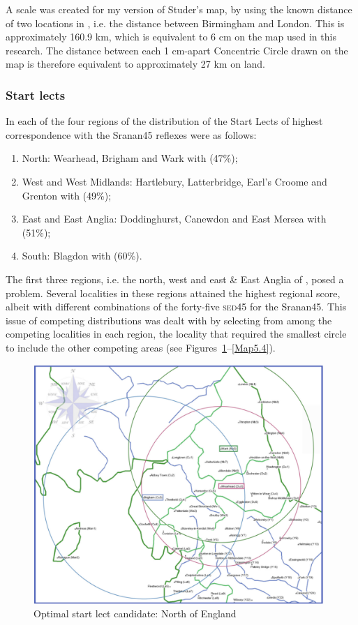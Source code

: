 A scale was created for my version of Studer's map, by using the known distance of two locations in , i.e. the distance between Birmingham and London. This is approximately 160.9 km, which is equivalent to 6 cm on the map used in this research. The distance between each 1 cm-apart Concentric Circle drawn on the map is therefore equivalent to approximately 27 km on land.

\subsubsection{Start lects}\label{5.4.1.1}
In each of the four regions of  the distribution of the Start Lects
of highest correspondence with the  Sranan45 reflexes were as follows:

\begin{enumerate}
\item {North: Wearhead, Brigham and Wark with  (47\%);}
\item {West and West Midlands: Hartlebury, Latterbridge, Earl's Croome and
Grenton with  (49\%);}
\item {East and East Anglia: Doddinghurst, Canewdon and East Mersea with
 (51\%);}
\item {South: Blagdon with  (60\%).}
\end{enumerate}

The first three regions, i.e. the north, west and east \& East Anglia of , posed a problem. Several localities in these regions attained the highest regional score, albeit with different combinations of the forty-five \textsc{sed45}  for the Sranan45. This issue of competing distributions was dealt with by selecting from among the competing localities in each region, the locality that required the smallest circle to include the other competing areas (see Figures~\ref{Map5.2}--\ref{Map5.4}).
 

\begin{figure}
\centering
\includegraphics[width=0.98\textwidth] {figures/north-loc.pdf}
\caption {Optimal start lect candidate: North of England} 
\label{Map5.2}
\end{figure}

